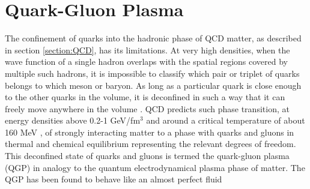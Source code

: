 \section{Quark-Gluon Plasma}
The confinement of quarks into the hadronic phase of QCD matter, as described in section \ref{section:QCD}, has its limitations. At very high densities, when the wave function of a single hadron overlaps with the spatial regions covered by multiple such hadrons, it is impossible to classify which pair or triplet of quarks belongs to which meson or baryon. As long as a particular quark is close enough to the other quarks in the volume, it is deconfined in such a way that it can freely move anywhere in the volume \cite{0954-3899-32-3-R01}. QCD predicts such phase transition, at energy densities above 0.2-1 GeV/fm$^{3}$ \cite{Adam:2139456} and around a critical temperature of about 160 MeV \cite{FLORIS2014103}, of strongly interacting matter to a phase with quarks and gluons in thermal and chemical equilibrium representing the relevant degrees of freedom. This deconfined state of quarks and gluons is termed the quark-gluon plasma (QGP) in analogy to the quantum electrodynamical plasma phase of matter. The QGP has been found to behave like an almost perfect fluid \cite{PhysRevLett.109.152303}
